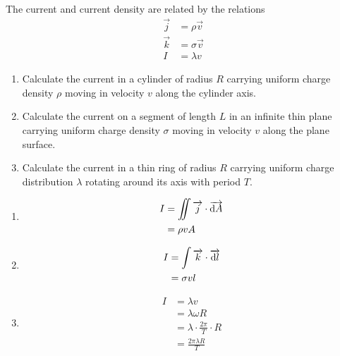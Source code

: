 \documentclass[fleqn, a4paper, 12pt, twoside]{article}
\theoremstyle{definition}
\theoremstyle{theorem}
\begin{document}
\begin{question}
	The current and current density are related by the relations
	\begin{align*}
		\overrightarrow{j} & = \rho \overrightarrow{v}   \\
		\overrightarrow{k} & = \sigma \overrightarrow{v} \\
		I                  & = \lambda v
	\end{align*}
	\begin{enumerate}
		\item Calculate the current in a cylinder of radius $R$ carrying uniform charge density $\rho$ moving in velocity $v$ along the cylinder axis.
		\item Calculate the current on a segment of length $L$ in an infinite thin plane carrying uniform charge density $\sigma$ moving in velocity $v$ along the plane surface.
		\item Calculate the current in a thin ring of radius $R$ carrying uniform charge distribution $\lambda$ rotating around its axis with period $T$.
	\end{enumerate}
\end{question}

\begin{solution}
	\begin{enumerate}[leftmargin = *]
		\item
			\begin{align*}
				I & = \iint \overrightarrow{j} \cdot \overrightarrow{\dif A} \\
                                  & = \rho v A
			\end{align*}
		\item
			\begin{align*}
				I & = \int \overrightarrow{k} \cdot \overrightarrow{\dif l} \\
                                  & = \sigma v l
			\end{align*}
		\item
			\begin{align*}
				I & = \lambda v                             \\
                                  & = \lambda \omega R                      \\
                                  & = \lambda \cdot \frac{2 \pi}{T} \cdot R \\
                                  & = \frac{2 \pi \lambda R}{T}
			\end{align*}
	\end{enumerate}
\end{solution}
\end{document}
